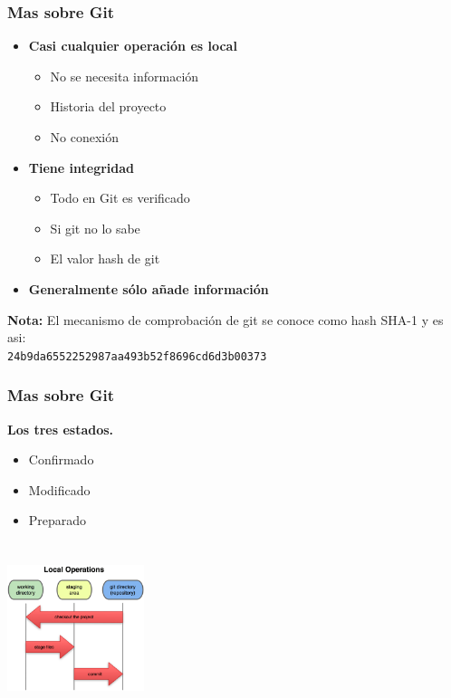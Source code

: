 \documentclass{beamer}
\begin{document}
	\begin{frame}
		\frametitle{Mas sobre Git}
		\begin{itemize}	
			\item \textbf{Casi cualquier operación es local}
				\begin{itemize}	
					\item No se necesita información
					\item Historia del proyecto
					\item No conexión
				\end{itemize}
			\item \textbf{Tiene integridad}
				\begin{itemize}	
					\item Todo en Git es verificado
					\item Si git no lo sabe
					\item El valor hash de git
				\end{itemize}
			\item \textbf{Generalmente sólo añade información}
		\end{itemize}
		{\scriptsize \textbf{Nota: } El mecanismo de comprobación de git se conoce como hash SHA-1 y es asi: 
		\\{\tt  24b9da6552252987aa493b52f8696cd6d3b00373}}\\
	\end{frame}
	
	\begin{frame}
		\frametitle{Mas sobre Git}
		\textbf{Los tres estados.}\\
		\begin{itemize}		
			\item Confirmado
			\item Modificado
			\item Preparado
		\end{itemize}
		\begin{center}
			\includegraphics[width=4cm,height=5cm]{imagen3.png}
		\end{center}
	\end{frame}
\end{document}
